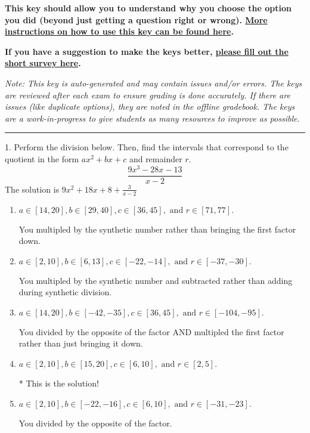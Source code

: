 \documentclass{extbook}[14pt]
\begin{document}
\textbf{This key should allow you to understand why you choose the option you did (beyond just getting a question right or wrong). \href{https://xronos.clas.ufl.edu/mac1105spring2020/courseDescriptionAndMisc/Exams/LearningFromResults}{More instructions on how to use this key can be found here}.}

\textbf{If you have a suggestion to make the keys better, \href{https://forms.gle/CZkbZmPbC9XALEE88}{please fill out the short survey here}.}

\textit{Note: This key is auto-generated and may contain issues and/or errors. The keys are reviewed after each exam to ensure grading is done accurately. If there are issues (like duplicate options), they are noted in the offline gradebook. The keys are a work-in-progress to give students as many resources to improve as possible.}

\rule{\textwidth}{0.4pt}

1. Perform the division below. Then, find the intervals that correspond to the quotient in the form $ax^2+bx+c$ and remainder $r$.
\[ \frac{9x^{3} -28 x -13}{x -2} \] 
The solution is $ 9x^{2} +18 x + 8 + \frac{3}{x -2} $ 

\begin{enumerate}[label=\Alph*.] 
\item $ a \in [14, 20], b \in [29, 40], c \in [36, 45], \text{ and } r \in [71, 77]. $ 

  You multipled by the synthetic number rather than bringing the first factor down. 
\item $ a \in [2, 10], b \in [6, 13], c \in [-22, -14], \text{ and } r \in [-37, -30]. $ 

  You multipled by the synthetic number and subtracted rather than adding during synthetic division. 
\item $ a \in [14, 20], b \in [-42, -35], c \in [36, 45], \text{ and } r \in [-104, -95]. $ 

  You divided by the opposite of the factor AND multipled the first factor rather than just bringing it down. 
\item $ a \in [2, 10], b \in [15, 20], c \in [6, 10], \text{ and } r \in [2, 5]. $ 

 * This is the solution! 
\item $ a \in [2, 10], b \in [-22, -16], c \in [6, 10], \text{ and } r \in [-31, -23]. $ 

  You divided by the opposite of the factor. 
\end{enumerate} 
 
\end{document}
